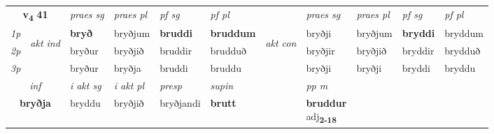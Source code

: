 \noindent
\begin{tabular}{lllllllllll} \toprule
\multicolumn{2}{c}{\textbf{v{\textsubscript{4}}} \Large{\textbf{41}}}  &  \textit{praes sg}  & \textit{praes pl}  &\textit{ pf sg} & \textit{pf pl} &  &  \textit{praes sg}  & \textit{praes pl}  & \textit{pf sg} & \textit{pf pl } \\*
	\cmidrule{3-6} \cmidrule{8-11}
 {\textit{1p}} & \multirow{3}{*}{\begin{turn}{90}\textit{akt ind}\end{turn}} & \textbf{bryð} & bryðjum & \textbf{bruddi} & \textbf{bruddum} & \multirow{3}{*}{\begin{turn}{90}\textit{akt con}\end{turn}} &bryðji & bryðjum & \textbf{bryddi} & bryddum\\*
 {\textit{2p}} &  &  bryður  & bryðjið & bruddir & brudduð & & bryðjir & bryðjið & bryddir & brydduð \\*
{\textit{3p}} &  & bryður & bryðja & bruddi & bruddu & & bryðji & bryðji& bryddi & bryddu \\*
\cmidrule{3-6} \cmidrule{8-11}

   \multicolumn{2}{c}{\textit{inf}}  & \textit{i akt sg} & \textit{i akt pl}   & \textit{presp} & \textit{supin}  && \textit{pp m} \\*
  \multicolumn{2}{c}{\textbf{bryðja}} & bryddu  & bryðjið   & bryðjandi &  \textbf{brutt}  && \specialcell{\textbf{bruddur} \\ adj\textbf{\textsubscript{2-18}}} \\*
\end{tabular}

